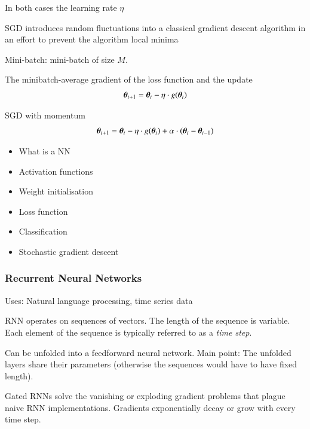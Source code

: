 


In both cases the learning rate $\eta$




SGD introduces random fluctuations into a classical gradient descent algorithm
in an effort to prevent the algorithm
local minima


Mini-batch:  mini-batch of size
$M$.

The minibatch-average gradient of the loss function
and the update
\begin{align*}
  \myvec{\theta}_{t + 1} = \myvec{\theta}_{t} - \eta \cdot g(\myvec{\theta}_{t})
\end{align*}

SGD with momentum
\begin{align*}
  \myvec{\theta}_{t + 1} =
  \myvec{\theta}_{t}
  - \eta \cdot g(\myvec{\theta}_{t})
  + \alpha \cdot (\myvec{\theta}_{t}- \myvec{\theta}_{t-1})
\end{align*}



\begin{itemize}

\item What is a NN

\item Activation functions

\item Weight initialisation

\item Loss function

\item Classification

\item Stochastic gradient descent

\end{itemize}


\subsubsection{Recurrent Neural Networks}%
\label{sec:rnn}

Uses: Natural language processing, time series data

RNN operates on sequences of vectors. The length of the sequence is
variable. Each element of the sequence is typically referred to as a \emph{time
  step}.

Can be unfolded into a feedforward neural network. Main point: The unfolded
layers share their parameters (otherwise the sequences would have to have fixed
length).


Gated RNNs solve the vanishing or exploding gradient problems that plague naive
RNN implementations. Gradients exponentially decay or grow with every time step.



